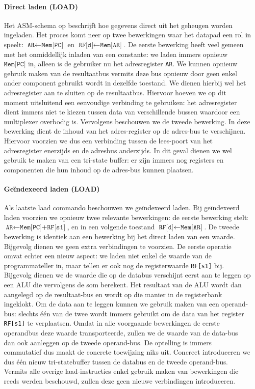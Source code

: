 \paragraph{Direct laden (LOAD)}
Het ASM-schema op  beschrijft hoe gegevens direct uit het geheugen worden ingeladen. Het proces komt neer op twee bewerkingen waar het datapad een rol in speelt: $\texttt{AR}\leftarrow\texttt{Mem[PC]}$ en $\texttt{RF[d]}\leftarrow\texttt{Mem[AR]}$. De eerste bewerking heeft veel gemeen met het onmiddellijk inladen van een constante: we laden immers opnieuw $\texttt{Mem[PC]}$ in, alleen is de gebruiker nu het adresregister \verb+AR+. We kunnen opnieuw gebruik maken van de resultaatbus vermits deze bus opnieuw door geen enkel ander component gebruikt wordt in dezelfde toestand. We dienen hierbij wel het adresregister aan te sluiten op de resultaatbus. Hiervoor hoeven we op dit moment uitsluitend een eenvoudige verbinding te gebruiken: het adresregister dient immers niet te kiezen tussen data van verschillende bussen waardoor een multiplexer overbodig is. Vervolgens beschouwen we de tweede bewerking. In deze bewerking dient de inhoud van het adres-register op de adres-bus te verschijnen. Hiervoor voorzien we dus een verbinding tussen de lees-poort van het adresregister enerzijds en de adresbus anderzijds. In dit geval dienen we wel gebruik te maken van een tri-state buffer: er zijn immers nog registers en componenten die hun inhoud op de adres-bus kunnen plaatsen.
\paragraph{Ge\"indexeerd laden (LOAD)}
Als laatste laad commando beschouwen we ge\"indexeerd laden. Bij ge\"indexeerd laden voorzien we opnieuw twee relevante bewerkingen: de eerste bewerking stelt: $\texttt{AR}\leftarrow\texttt{Mem[PC]+RF[s1]}$, en in een volgende toestand $\texttt{RF[d]}\leftarrow\texttt{Mem[AR]}$. De tweede bewerking is identiek aan een bewerking bij het direct laden van een waarde. Bijgevolg dienen we geen extra verbindingen te voorzien. De eerste operatie omvat echter een nieuw aspect: we laden niet enkel de waarde van de programmateller in, maar tellen er ook nog de registerwaarde \texttt{RF[s1]} bij. Bijgevolg dienen we de waarde die op de databus verschijnt eerst aan te leggen op een ALU die vervolgens de som berekent. Het resultaat van de ALU wordt dan aangelegd op de resultaat-bus en wordt op die manier in de registerbank ingeklokt. Om de data aan te leggen kunnen we gebruik maken van een operand-bus: slechts \'e\'en van de twee wordt immers gebruikt om de data van het register \texttt{RF[s1]} te verplaatsen. Omdat in alle voorgaande bewerkingen de eerste operandbus deze waarde transporteerde, zullen we de waarde van de data-bus dan ook aanleggen op de tweede operand-bus. De optelling is immers commutatief dus maakt de concrete toewijzing niks uit. Concreet introduceren we dus \'e\'en nieuw tri-statebuffer tussen de databus en de tweede operand-bus. Vermits alle overige laad-instructies enkel gebruik maken van bewerkingen die reeds werden beschouwd, zullen deze geen nieuwe verbindingen introduceren.

